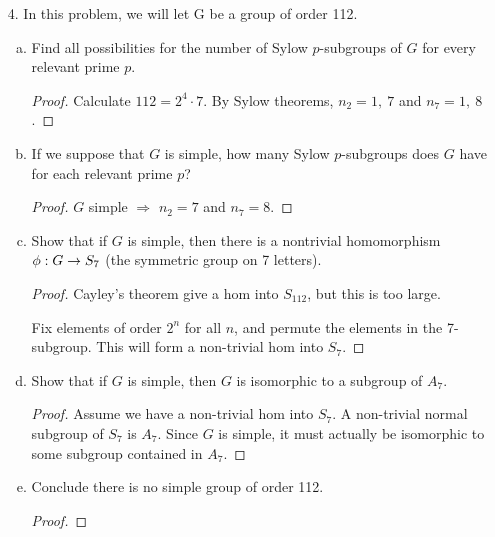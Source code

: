 \begin{itemize}
\begin{enumerate}[(a)]
\item Prove that if $A^2$ has eigenvalue $\lambda^2$ then $\lambda$ or $-\lambda$ is an eigenvalue for $A$.
\begin{proof}

\end{proof}
\end{enumerate}









\item[4.] In this problem, we will let G be a group of order 112.
\begin{enumerate}[(a)]
\item Find all possibilities for the number of Sylow $p$-subgroups of $G$ for
every relevant prime $p$.
\begin{proof}
Calculate $112 = 2^4 \cdot 7$. By Sylow theorems, $n_2 = 1, \ 7$ and $n_7 = 1, \ 8$.
\end{proof}

\item If we suppose that $G$ is simple, how many Sylow $p$-subgroups does $G$ have for each relevant prime $p$?
\begin{proof}
$G$ simple $\Rightarrow$ $n_2 = 7$ and $n_7 = 8$.
\end{proof}

\item Show that if $G$ is simple, then there is a nontrivial homomorphism $\phi : G \rightarrow S_7$ (the symmetric group on 7 letters).
\begin{proof}
Cayley's theorem give a hom into $S_{112}$, but this is too large. 

Fix elements of order $2^n$ for all $n$, and permute the elements in the 7-subgroup. This will form a non-trivial hom into $S_7$.
\end{proof}

\item Show that if $G$ is simple, then $G$ is isomorphic to a subgroup of $A_7$.
\begin{proof}
Assume we have a non-trivial hom into $S_7$. A non-trivial normal subgroup of $S_7$ is $A_7$. Since $G$ is simple, it must actually be isomorphic to some subgroup contained in $A_7$.
\end{proof}

\item Conclude there is no simple group of order 112.
\begin{proof}


\end{proof}
\end{enumerate}
\end{itemize}
